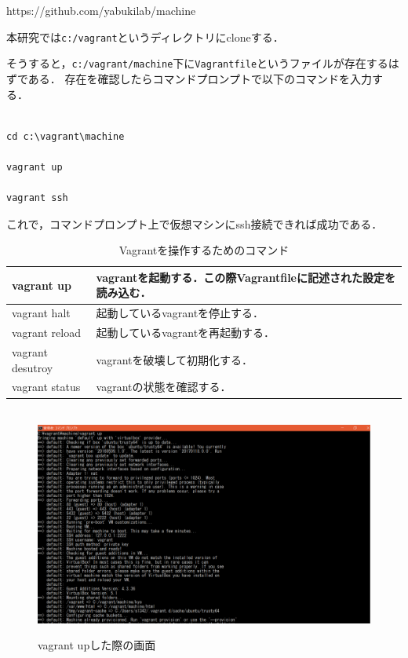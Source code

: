 https://github.com/yabukilab/machine

本研究では\texttt{c:/vagrant}というディレクトリにcloneする．

そうすると，\texttt{c:/vagrant/machine}下に\texttt{Vagrantfile}というファイルが存在するはずである．
存在を確認したらコマンドプロンプトで以下のコマンドを入力する．

\begin{verbatim}

cd c:\vagrant\machine

vagrant up

vagrant ssh

\end{verbatim}

これで，コマンドプロンプト上で仮想マシンにssh接続できれば成功である．

\begin{table}[htb]
   \caption{Vagrantを操作するためのコマンド}
  \begin{tabular}{|p{3cm}|p{9.5cm}|} \hline 
   vagrant up & vagrantを起動する．この際Vagrantfileに記述された設定を読み込む． \\ \hline \hline
   vagrant halt & 起動しているvagrantを停止する． \\ \hline
   vagrant reload  & 起動しているvagrantを再起動する．   \\ \hline
   vagrant desutroy & vagrantを破壊して初期化する． \\ \hline
   vagrant status & vagrantの状態を確認する． \\ \hline
  \end{tabular}
\end{table}

\begin{figure}[htbp]
\centering　
\includegraphics[width=13cm]{vagrantup.png}
\caption{vagrant upした際の画面}
\end{figure}

